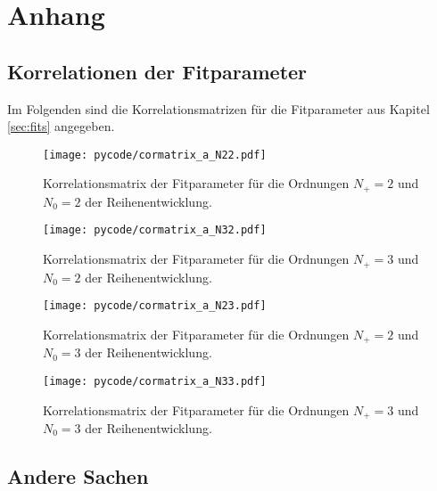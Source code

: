 \chapter{Anhang}

\section{Korrelationen der Fitparameter}
Im Folgenden sind die Korrelationsmatrizen für die Fitparameter aus Kapitel \ref{sec:fits} angegeben.
\begin{figure}
  \centering
  \texttt{[image: pycode/cormatrix\_a\_N22.pdf]}
  \caption{Korrelationsmatrix der Fitparameter für die Ordnungen $N_+ = \num{2}$ und $N_0 = \num{2}$ der Reihenentwicklung.}
  \label{fig:fitcor22}
\end{figure}

\begin{figure}
  \centering
  \texttt{[image: pycode/cormatrix\_a\_N32.pdf]}
  \caption{Korrelationsmatrix der Fitparameter für die Ordnungen $N_+ = \num{3}$ und $N_0 = \num{2}$ der Reihenentwicklung.}
  \label{fig:fitcor32}
\end{figure}

\begin{figure}
  \centering
  \texttt{[image: pycode/cormatrix\_a\_N23.pdf]}
  \caption{Korrelationsmatrix der Fitparameter für die Ordnungen $N_+ = \num{2}$ und $N_0 = \num{3}$ der Reihenentwicklung.}
  \label{fig:fitcor23}
\end{figure}

\begin{figure}
  \centering
  \texttt{[image: pycode/cormatrix\_a\_N33.pdf]}
  \caption{Korrelationsmatrix der Fitparameter für die Ordnungen $N_+ = \num{3}$ und $N_0 = \num{3}$ der Reihenentwicklung.}
  \label{fig:fitcor33}
\end{figure}

\section{Andere Sachen}

\nocite{tikzfeynman}

